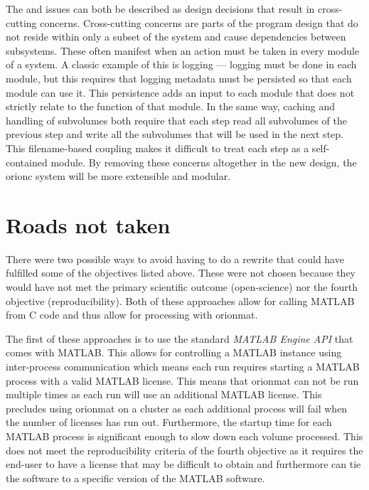 The  and 
issues can both be described as design decisions that result in cross-cutting
concerns. Cross-cutting concerns are parts of the program design
that do not reside within only a subset of the system and cause
dependencies between subsystems. These often manifest when an
action must be taken in every module of a system. A classic
example of this is logging --- logging must be done in each
module, but this requires that logging metadata must be persisted
so that each module can use it. This persistence adds an input to
each module that does not strictly relate to the function of
that module. In the same way, caching and handling of subvolumes
both require that each step read all subvolumes of the previous
step and write all the subvolumes that will be used in the next
step. This filename-based coupling makes it difficult to treat
each step as a self-contained module. By removing these concerns
altogether in the new design, the \gls{orionc} system will be more
extensible and modular.

\section{Roads not taken}

There were two possible ways to avoid having to do a rewrite that
could have fulfilled some of the objectives listed above.
These were not chosen because they would have not met the primary
scientific outcome (open-science) nor the fourth objective
(reproducibility). Both of these approaches allow for calling
MATLAB from C code and thus allow for processing with
\gls{orionmat}.

{
	The first of these approaches is to use the standard
	\emph{MATLAB Engine API} that comes with MATLAB. This allows for controlling a
	MATLAB instance using inter-process communication which
	means each run requires starting a MATLAB process with a
	valid MATLAB license. This means that \gls{orionmat}
	can not be run multiple times as each run will use an
	additional MATLAB license. This precludes using
	\gls{orionmat} on a cluster as each additional process
	will fail when the number of licenses has run out.
	Furthermore, the startup time for each MATLAB process is
	significant enough to slow down each volume processed.
	This does not meet the reproducibility criteria of the
	fourth objective as it requires the end-user to have a
	license that may be difficult to obtain and furthermore
	can tie the software to a specific version of the MATLAB
	software.
}

